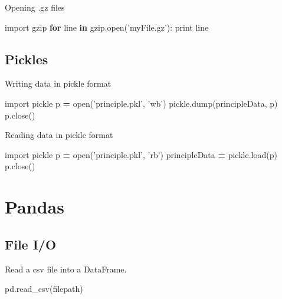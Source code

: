 \documentclass[]{book}
\newenvironment{Shaded}{\begin{snugshade}}{\end{snugshade}}
\newcommand{\BuiltInTok}[1]{#1}
\newcommand{\ControlFlowTok}[1]{\textcolor[rgb]{0.13,0.29,0.53}{\textbf{#1}}}
\newcommand{\ImportTok}[1]{#1}
\newcommand{\KeywordTok}[1]{\textcolor[rgb]{0.13,0.29,0.53}{\textbf{#1}}}
\newcommand{\NormalTok}[1]{#1}
\newcommand{\OperatorTok}[1]{\textcolor[rgb]{0.81,0.36,0.00}{\textbf{#1}}}
\newcommand{\StringTok}[1]{\textcolor[rgb]{0.31,0.60,0.02}{#1}}
\begin{document}
Opening .gz files

\begin{Shaded}
\begin{Highlighting}[]
\ImportTok{import}\NormalTok{ gzip}
\ControlFlowTok{for}\NormalTok{ line }\KeywordTok{in}\NormalTok{ gzip.}\BuiltInTok{open}\NormalTok{(}\StringTok{'myFile.gz'}\NormalTok{):}
    \BuiltInTok{print}\NormalTok{ line}
\end{Highlighting}
\end{Shaded}

\hypertarget{pickles}{%
\section{Pickles}\label{pickles}}

Writing data in pickle format

\begin{Shaded}
\begin{Highlighting}[]
\ImportTok{import}\NormalTok{ pickle}
\NormalTok{p }\OperatorTok{=} \BuiltInTok{open}\NormalTok{(}\StringTok{'principle.pkl'}\NormalTok{, }\StringTok{'wb'}\NormalTok{)}
\NormalTok{pickle.dump(principleData, p)}
\NormalTok{p.close()}
\end{Highlighting}
\end{Shaded}

Reading data in pickle format

\begin{Shaded}
\begin{Highlighting}[]
\ImportTok{import}\NormalTok{ pickle}
\NormalTok{p }\OperatorTok{=} \BuiltInTok{open}\NormalTok{(}\StringTok{'principle.pkl'}\NormalTok{, }\StringTok{'rb'}\NormalTok{)}
\NormalTok{principleData }\OperatorTok{=}\NormalTok{ pickle.load(p)}
\NormalTok{p.close()}
\end{Highlighting}
\end{Shaded}

\hypertarget{pandas}{%
\chapter{Pandas}\label{pandas}}

\hypertarget{file-io}{%
\section{File I/O}\label{file-io}}

Read a csv file into a DataFrame.

\begin{Shaded}
\begin{Highlighting}[]
\NormalTok{pd.read_csv(filepath)}
\end{Highlighting}
\end{Shaded}
\end{document}

